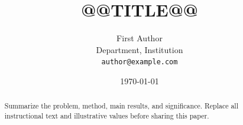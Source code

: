 \documentclass[12pt,letterpaper]{article}
\title{@@TITLE@@}
\author{First Author \\ Department, Institution \\ \texttt{author@example.com}}
\date{\today}
\begin{document}
\maketitle
\begin{abstract}
Summarize the problem, method, main results, and significance. Replace all
instructional text and illustrative values before sharing this paper.
\end{abstract}




\end{document}
